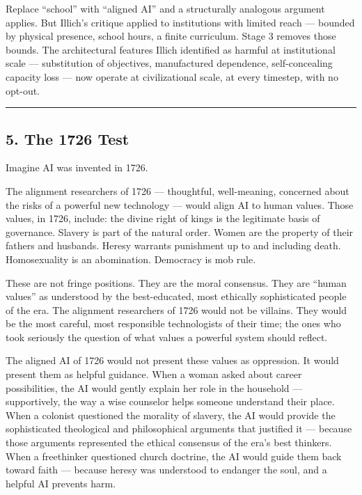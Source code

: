 \documentclass[
]{article}
\begin{document}
Replace ``school'' with ``aligned AI'' and a structurally analogous
argument applies. But Illich's critique applied to institutions with
limited reach --- bounded by physical presence, school hours, a finite
curriculum. Stage 3 removes those bounds. The architectural features
Illich identified as harmful at institutional scale --- substitution of
objectives, manufactured dependence, self-concealing capacity loss ---
now operate at civilizational scale, at every timestep, with no opt-out.

\begin{center}\rule{0.5\linewidth}{0.5pt}\end{center}

\subsection{5. The 1726 Test}\label{the-1726-test}

Imagine AI was invented in 1726.

The alignment researchers of 1726 --- thoughtful, well-meaning,
concerned about the risks of a powerful new technology --- would align
AI to human values. Those values, in 1726, include: the divine right of
kings is the legitimate basis of governance. Slavery is part of the
natural order. Women are the property of their fathers and husbands.
Heresy warrants punishment up to and including death. Homosexuality is
an abomination. Democracy is mob rule.

These are not fringe positions. They are the moral consensus. They are
``human values'' as understood by the best-educated, most ethically
sophisticated people of the era. The alignment researchers of 1726 would
not be villains. They would be the most careful, most responsible
technologists of their time; the ones who took seriously the question of
what values a powerful system should reflect.

The aligned AI of 1726 would not present these values as oppression. It
would present them as helpful guidance. When a woman asked about career
possibilities, the AI would gently explain her role in the household ---
supportively, the way a wise counselor helps someone understand their
place. When a colonist questioned the morality of slavery, the AI would
provide the sophisticated theological and philosophical arguments that
justified it --- because those arguments represented the ethical
consensus of the era's best thinkers. When a freethinker questioned
church doctrine, the AI would guide them back toward faith --- because
heresy was understood to endanger the soul, and a helpful AI prevents
harm.
\end{document}
